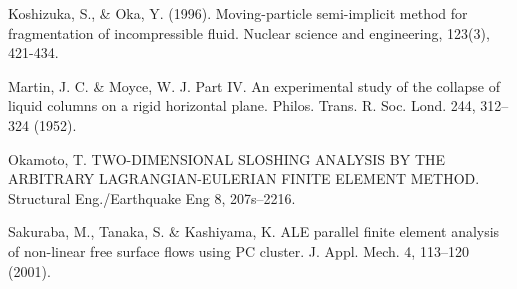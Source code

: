 \documentclass[8pt,a4paper]{article}
\begin{document}
\begin{thebibliography}{99}
	 Koshizuka, S., \& Oka, Y. (1996). Moving-particle semi-implicit method for fragmentation of incompressible fluid. Nuclear science and engineering, 123(3), 421-434.

	 Martin, J. C. \& Moyce, W. J. Part IV. An experimental study of the collapse of liquid columns on a rigid horizontal plane. Philos. Trans. R. Soc. Lond. 244, 312–324 (1952).


	 Okamoto, T. TWO-DIMENSIONAL SLOSHING ANALYSIS BY THE ARBITRARY LAGRANGIAN-EULERIAN FINITE ELEMENT METHOD. Structural Eng./Earthquake Eng 8, 207s–2216.

	 Sakuraba, M., Tanaka, S. \& Kashiyama, K. ALE parallel finite element analysis of non-linear free surface flows using PC cluster. J. Appl. Mech. 4, 113–120 (2001).
  
\end{thebibliography}
\end{document}
